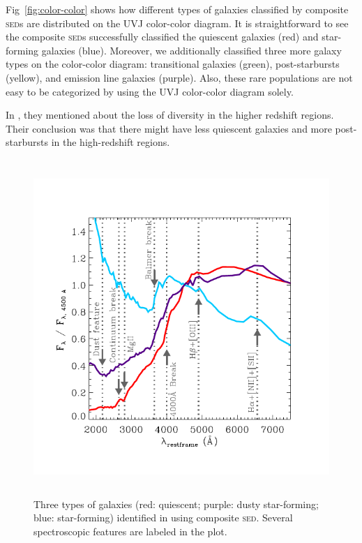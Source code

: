 \documentclass{ar-1col}
\begin{document}
Fig~\ref{fig:color-color} shows how different types of galaxies classified by composite \textsc{sed}s are distributed on the UVJ color-color diagram.
It is straightforward to see the composite \textsc{sed}s successfully classified the quiescent galaxies (red) and star-forming galaxies (blue).
Moreover, we additionally classified three more galaxy types on the color-color diagram: transitional galaxies (green), post-starbursts (yellow), and emission line galaxies (purple).
Also, these rare populations are not easy to be categorized by using the UVJ color-color diagram solely.

In \citet{Forrest2018}, they mentioned about the loss of diversity in the higher redshift regions. 
Their conclusion was that there might have less quiescent galaxies and more post-starbursts in the high-redshift regions.


\begin{figure}
    \includegraphics[width=5in, height=5in]{images/spectral_features.pdf}
    \caption{Three types of galaxies (red: quiescent; purple: dusty star-forming; blue: star-forming) identified in \citet{Kriek2011} using composite \textsc{sed}. Several spectroscopic features are labeled in the plot.}
    \label{fig:kreiksed}
\end{figure}
\end{document}
